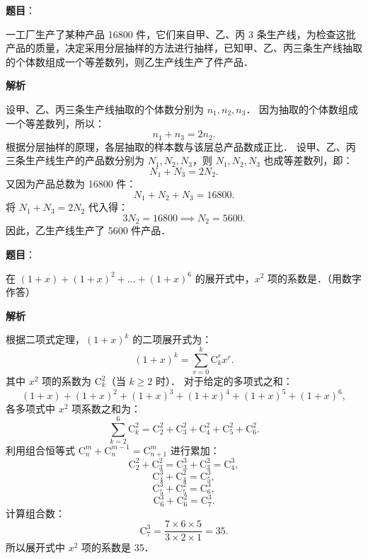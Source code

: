\begin{answer}

\textbf{题目}：

一工厂生产了某种产品 16800 件，它们来自甲、乙、丙 3 条生产线，为检查这批产品的质量，决定采用分层抽样的方法进行抽样，已知甲、乙、丙三条生产线抽取的个体数组成一个等差数列，则乙生产线生产了\gkblank{}件产品．

\textbf{解析}

设甲、乙、丙三条生产线抽取的个体数分别为 $n_1, n_2, n_3$．
因为抽取的个体数组成一个等差数列，所以：
\nopagebreak[4]
\[
n_1 + n_3 = 2n_2.
\]
根据分层抽样的原理，各层抽取的样本数与该层总产品数成正比．
设甲、乙、丙三条生产线生产的产品数分别为 $N_1, N_2, N_3$，则 $N_1, N_2, N_3$ 也成等差数列，即：
\nopagebreak[4]
\[
N_1 + N_3 = 2N_2.
\]
又因为产品总数为 16800 件：
\nopagebreak[4]
\[
N_1 + N_2 + N_3 = 16800.
\]
将 $N_1 + N_3 = 2N_2$ 代入得：
\nopagebreak[4]
\[
3N_2 = 16800 \implies N_2 = 5600.
\]
因此，乙生产线生产了 5600 件产品．


\end{answer}
\begin{answer}

\textbf{题目}：

在 $(1 + x) + (1 + x)^2 + \dots + (1 + x)^6$ 的展开式中，$x^2$ 项的系数是\gkblank{}．（用数字作答）

\textbf{解析}

根据二项式定理，$(1 + x)^k$ 的二项展开式为：
\nopagebreak[4]
\[
(1 + x)^k = \sum_{r=0}^k \mathrm{C}_k^r x^r.
\]
其中 $x^2$ 项的系数为 $\mathrm{C}_k^2$（当 $k \geqslant 2$ 时）．
对于给定的多项式之和：
\nopagebreak[4]
\[
(1 + x) + (1 + x)^2 + (1 + x)^3 + (1 + x)^4 + (1 + x)^5 + (1 + x)^6,
\]
各多项式中 $x^2$ 项系数之和为：
\nopagebreak[4]
\[
\sum_{k=2}^6 \mathrm{C}_k^2 = \mathrm{C}_2^2 + \mathrm{C}_3^2 + \mathrm{C}_4^2 + \mathrm{C}_5^2 + \mathrm{C}_6^2.
\]
利用组合恒等式 $\mathrm{C}_n^m + \mathrm{C}_n^{m-1} = \mathrm{C}_{n+1}^m$ 进行累加：
\nopagebreak[4]
\[
\mathrm{C}_2^2 + \mathrm{C}_3^2 = \mathrm{C}_3^3 + \mathrm{C}_3^2 = \mathrm{C}_4^3,
\]
\nopagebreak[4]
\[
\mathrm{C}_4^3 + \mathrm{C}_4^2 = \mathrm{C}_5^3,
\]
\nopagebreak[4]
\[
\mathrm{C}_5^3 + \mathrm{C}_5^2 = \mathrm{C}_6^3,
\]
\nopagebreak[4]
\[
\mathrm{C}_6^3 + \mathrm{C}_6^2 = \mathrm{C}_7^3.
\]
计算组合数：
\nopagebreak[4]
\[
\mathrm{C}_7^3 = \frac{7 \times 6 \times 5}{3 \times 2 \times 1} = 35.
\]
所以展开式中 $x^2$ 项的系数是 35．


\end{answer}
